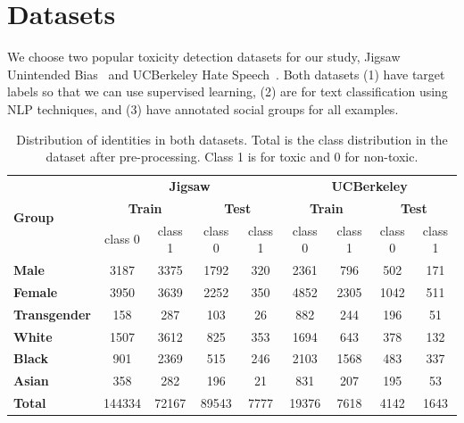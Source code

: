 \documentclass[11pt]{article} %
\begin{document}
\section{Datasets}
\label{sec:dataset}
We choose two popular toxicity detection datasets for our study, Jigsaw Unintended Bias~\cite{borkan2019nuanced} and UCBerkeley Hate Speech~\cite{kennedy2020constructing}. Both datasets (1) have target labels so that we can use supervised learning, (2) are for text classification using NLP techniques, and (3) have annotated social groups for all examples. 

\begin{table}[htbp]
\centering
\begin{adjustbox}{max width=0.75\textwidth}
\begin{tabular}{@{}l|cccc|cccc@{}}
\toprule
\multirow{3}{*}{\textbf{Group}} & \multicolumn{4}{c}{\textbf{Jigsaw}} & \multicolumn{4}{c}{\textbf{UCBerkeley}} \\ \cline{2-9}\
 & \multicolumn{2}{c}{\textbf{Train}} & \multicolumn{2}{c}{\textbf{Test}} & \multicolumn{2}{c}{\textbf{Train}} & \multicolumn{2}{c}{\textbf{Test}} \\ \cline{2-9}
 & class 0 & class 1 & class  0 & class 1 & class 0 & class 1 & class  0 & class 1 \\ \midrule
\textbf{Male} & 3187 & 3375 & 1792 & 320  &2361 &	796	 &502 &	171 \\
\textbf{Female} & 3950 & 3639 & 2252 & 350 & 4852 &	2305 &	1042 &	511\\
\textbf{Transgender} & 158 & 287 & 103 & 26 & 882 &	244  &	196 & 51 \\ 
\cmidrule{2-9}

\textbf{White} & 1507 & 3612 & 825 & 353 & 1694 &	643	 & 378	 & 132\\
\textbf{Black} & 901 & 2369 & 515 & 246 & 2103 &	1568 &	483	 & 337 \\ 
\textbf{Asian} & 358 & 282 & 196 & 21 & 831 &	207 &	195 &	53 \\
\cmidrule{2-9}

\textbf{Total} & 144334 & 72167 & 89543 & 7777 & 19376 & 7618 & 4142 & 1643 \\ 

\bottomrule
\end{tabular}
\end{adjustbox}
\caption{Distribution of identities in both datasets. Total is the class distribution in the dataset after pre-processing. Class 1 is for toxic and 0 for non-toxic.}
\label{table:dataset_distribution}
\end{table}
\end{document}

